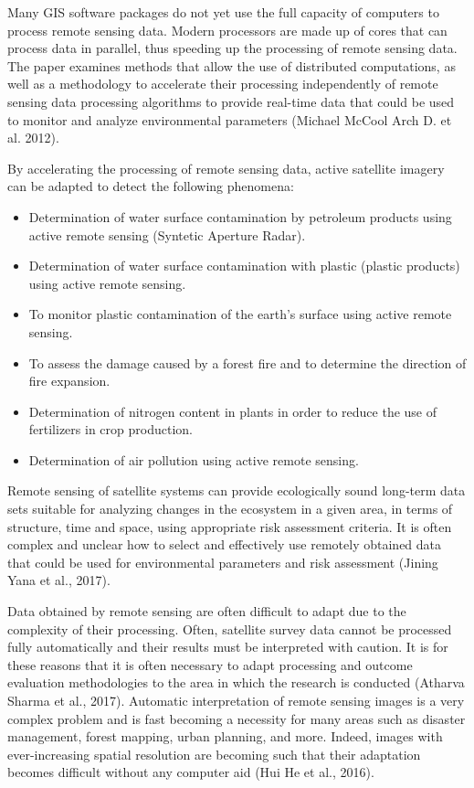 {{{	Many GIS software packages do not yet use the full capacity of computers to process remote sensing data. Modern processors are made up of cores that can process data in parallel, thus speeding up the processing of remote sensing data. The paper examines methods that allow the use of distributed computations, as well as a methodology to accelerate their processing independently of remote sensing data processing algorithms to provide real-time data that could be used to monitor and analyze environmental parameters (Michael McCool Arch D. et al. 2012).
	
	By accelerating the processing of remote sensing data, active satellite imagery can be adapted to detect the following phenomena:
	
	\begin{itemize}
		\item Determination of water surface contamination by petroleum products using active remote sensing (Syntetic Aperture Radar).
		\item Determination of water surface contamination with plastic (plastic products) using active remote sensing.
		\item To monitor plastic contamination of the earth's surface using active remote sensing.
		\item To assess the damage caused by a forest fire and to determine the direction of fire expansion.
		\item Determination of nitrogen content in plants in order to reduce the use of fertilizers in crop production.
		\item Determination of air pollution using active remote sensing.
	\end{itemize}
	
	Remote sensing of satellite systems can provide ecologically sound long-term data sets suitable for analyzing changes in the ecosystem in a given area, in terms of structure, time and space, using appropriate risk assessment criteria. It is often complex and unclear how to select and effectively use remotely obtained data that could be used for environmental parameters and risk assessment (Jining Yana et al., 2017).
	
	Data obtained by remote sensing are often difficult to adapt due to the complexity of their processing. Often, satellite survey data cannot be processed fully automatically and their results must be interpreted with caution. It is for these reasons that it is often necessary to adapt processing and outcome evaluation methodologies to the area in which the research is conducted (Atharva Sharma et al., 2017).
	Automatic interpretation of remote sensing images is a very complex problem and is fast becoming a necessity for many areas such as disaster management, forest mapping, urban planning, and more. Indeed, images with ever-increasing spatial resolution are becoming such that their adaptation becomes difficult without any computer aid (Hui He et al., 2016).
	
}}}
